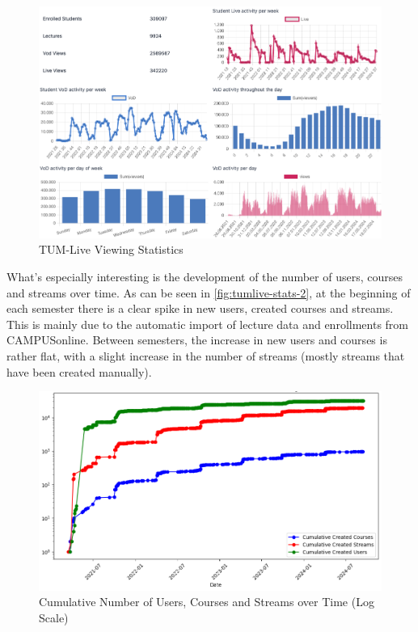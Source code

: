 \begin{figure}[htpb]
    \centering
    \includegraphics[width=\linewidth]{images/TUMLiveStats.png}
    \caption[TUM-Live Statistics]{TUM-Live Viewing Statistics}\label{fig:tumlive-stats}
\end{figure}

What's especially interesting is the development of the number of users, courses and streams over time. As can be seen in \autoref{fig:tumlive-stats-2}, at the beginning of each semester there is a clear spike in new users, created courses and streams. This is mainly due to the automatic import of lecture data and enrollments from CAMPUSonline. Between semesters, the increase in new users and courses is rather flat, with a slight increase in the number of streams (mostly streams that have been created manually).  

\begin{figure}[htpb]
    \centering
    \includegraphics[width=\linewidth]{images/TUMLiveStats2.png}
    \caption[Cumulative Number of Users, Courses and Streams over Time (Log Scale)]{Cumulative Number of Users, Courses and Streams over Time (Log Scale)}\label{fig:tumlive-stats-2}
\end{figure}
